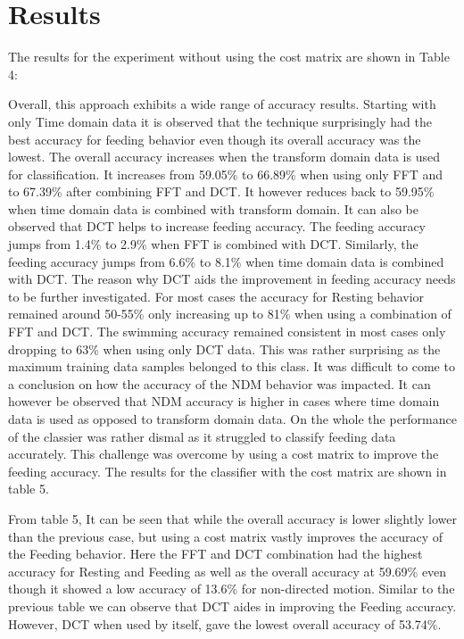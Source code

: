 \documentclass[conference]{IEEEtran}
\begin{document}
\section{Results}

The results for the experiment without using the cost matrix are shown in Table 4:


Overall, this approach exhibits a wide range of accuracy results. Starting with only Time domain data it is observed that the technique surprisingly had the best accuracy for feeding behavior even though its overall accuracy was the lowest. The overall accuracy increases when the transform domain data is used for classification. It increases from 59.05\% to 66.89\% when using only FFT and to 67.39\% after combining FFT and DCT. It however reduces back to 59.95\% when time domain data is combined with transform domain. It can also be observed that DCT helps to increase feeding accuracy. The feeding accuracy jumps from 1.4\% to 2.9\% when FFT is combined with DCT. Similarly, the feeding accuracy jumps from 6.6\% to 8.1\% when time domain data is combined with DCT. The reason why DCT aids the improvement in feeding accuracy needs to be further investigated. For most cases the accuracy for Resting behavior remained around 50-55\% only increasing up to 81\% when using a combination of FFT and DCT. The swimming accuracy remained consistent in most cases only dropping to 63\% when using only DCT data. This was rather surprising as the maximum training data samples belonged to this class. It was difficult to come to a conclusion on how the accuracy of the NDM behavior was impacted. It can however be observed that NDM accuracy is higher in cases where time domain data is used as opposed to transform domain data. On the whole the performance of the classier was rather dismal as it struggled to classify feeding data accurately. This challenge was overcome by using a cost matrix to improve the feeding accuracy. The results for the classifier with the cost matrix are shown in table 5.


From table 5, It can be seen that while the overall accuracy is lower slightly lower than the previous case, but using a cost matrix vastly improves the accuracy of the Feeding behavior. Here the FFT and DCT combination had the highest accuracy for Resting and Feeding as well as the overall accuracy at 59.69\% even though it showed a low accuracy of 13.6\% for non-directed motion. Similar to the previous table we can observe that DCT aides in improving the Feeding accuracy. However, DCT when used by  itself,  gave the lowest overall accuracy of 53.74\%. 
\end{document}
